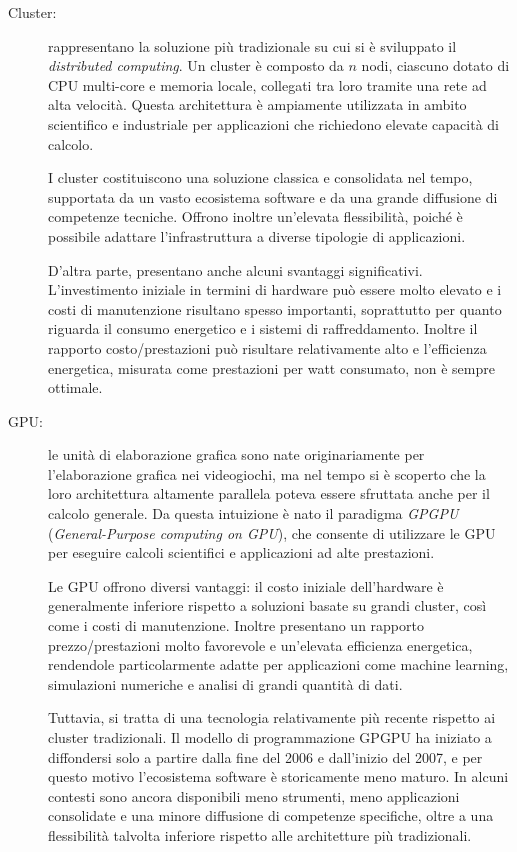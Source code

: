 \begin{description}

\item[Cluster:] rappresentano la soluzione più tradizionale su cui si è sviluppato il \emph{distributed computing}. 
Un cluster è composto da $n$ nodi, ciascuno dotato di CPU multi-core e memoria locale, collegati tra loro tramite una rete ad alta velocità. 
Questa architettura è ampiamente utilizzata in ambito scientifico e industriale per applicazioni che richiedono elevate capacità di calcolo.

I cluster costituiscono una soluzione classica e consolidata nel tempo, supportata da un vasto ecosistema software e da una grande diffusione di competenze tecniche. 
Offrono inoltre un'elevata flessibilità, poiché è possibile adattare l'infrastruttura a diverse tipologie di applicazioni.

D'altra parte, presentano anche alcuni svantaggi significativi. 
L'investimento iniziale in termini di hardware può essere molto elevato e i costi di manutenzione risultano spesso importanti, soprattutto per quanto riguarda il consumo energetico e i sistemi di raffreddamento. 
Inoltre il rapporto costo/prestazioni può risultare relativamente alto e l'efficienza energetica, misurata come prestazioni per watt consumato, non è sempre ottimale.

\item[GPU:] le unità di elaborazione grafica sono nate originariamente per l'elaborazione grafica nei videogiochi, ma nel tempo si è scoperto che la loro architettura altamente parallela poteva essere sfruttata anche per il calcolo generale. 
Da questa intuizione è nato il paradigma \emph{GPGPU} (\emph{General-Purpose computing on GPU}), che consente di utilizzare le GPU per eseguire calcoli scientifici e applicazioni ad alte prestazioni.

Le GPU offrono diversi vantaggi: il costo iniziale dell'hardware è generalmente inferiore rispetto a soluzioni basate su grandi cluster, così come i costi di manutenzione. 
Inoltre presentano un rapporto prezzo/prestazioni molto favorevole e un'elevata efficienza energetica, rendendole particolarmente adatte per applicazioni come machine learning, simulazioni numeriche e analisi di grandi quantità di dati.

Tuttavia, si tratta di una tecnologia relativamente più recente rispetto ai cluster tradizionali. 
Il modello di programmazione GPGPU ha iniziato a diffondersi solo a partire dalla fine del 2006 e dall'inizio del 2007, e per questo motivo l'ecosistema software è storicamente meno maturo. 
In alcuni contesti sono ancora disponibili meno strumenti, meno applicazioni consolidate e una minore diffusione di competenze specifiche, oltre a una flessibilità talvolta inferiore rispetto alle architetture più tradizionali.


\end{description}
